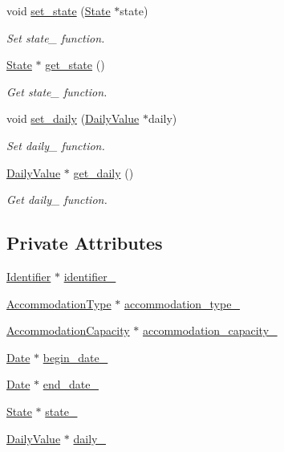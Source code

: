 \begin{DoxyCompactItemize}
void \hyperlink{classAccommodation_abc66acd75b38eb8def93e7dd97ec0b62}{set\+\_\+state} (\hyperlink{classState}{State} $\ast$state)
\begin{DoxyCompactList}\small\item\em Set state\+\_\+ function. \end{DoxyCompactList}\item 
\hyperlink{classState}{State} $\ast$ \hyperlink{classAccommodation_a396f748bfbe3f113f10cc8b5aabae771}{get\+\_\+state} ()
\begin{DoxyCompactList}\small\item\em Get state\+\_\+ function. \end{DoxyCompactList}\item 
void \hyperlink{classAccommodation_a34513c5c695189970d25edf99df2bea2}{set\+\_\+daily} (\hyperlink{classDailyValue}{Daily\+Value} $\ast$daily)
\begin{DoxyCompactList}\small\item\em Set daily\+\_\+ function. \end{DoxyCompactList}\item 
\hyperlink{classDailyValue}{Daily\+Value} $\ast$ \hyperlink{classAccommodation_ac075dd2d44ec5e609d0c07a86fce45a0}{get\+\_\+daily} ()
\begin{DoxyCompactList}\small\item\em Get daily\+\_\+ function. \end{DoxyCompactList}\end{DoxyCompactItemize}
\subsection*{Private Attributes}
\begin{DoxyCompactItemize}
\item 
\hyperlink{classIdentifier}{Identifier} $\ast$ \hyperlink{classAccommodation_a44fac71f51c582f9a8ef87810b5e52fc}{identifier\+\_\+}
\item 
\hyperlink{classAccommodationType}{Accommodation\+Type} $\ast$ \hyperlink{classAccommodation_a4723e6ff8384fcec8f8050838718f736}{accommodation\+\_\+type\+\_\+}
\item 
\hyperlink{classAccommodationCapacity}{Accommodation\+Capacity} $\ast$ \hyperlink{classAccommodation_af3bf33302ee5aa7f10082e68d9ea0cf2}{accommodation\+\_\+capacity\+\_\+}
\item 
\hyperlink{classDate}{Date} $\ast$ \hyperlink{classAccommodation_a7dd8db2c54db102d489917d54eb72f7c}{begin\+\_\+date\+\_\+}
\item 
\hyperlink{classDate}{Date} $\ast$ \hyperlink{classAccommodation_a793df0ed746ce5385b47af950145f0b0}{end\+\_\+date\+\_\+}
\item 
\hyperlink{classState}{State} $\ast$ \hyperlink{classAccommodation_a32f0062a48593019f2c22c7c97404b37}{state\+\_\+}
\item 
\hyperlink{classDailyValue}{Daily\+Value} $\ast$ \hyperlink{classAccommodation_a70b760e8b582bd0f0f535c2018204e0f}{daily\+\_\+}
\end{DoxyCompactItemize}


